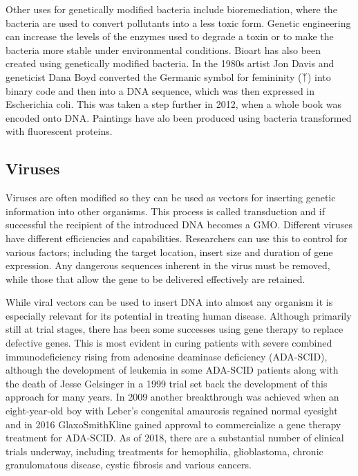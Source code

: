 Other uses for genetically modified bacteria include bioremediation, where the bacteria are used to convert pollutants into a less toxic form. Genetic engineering can increase the levels of the enzymes used to degrade a toxin or to make the bacteria more stable under environmental conditions. Bioart has also been created using genetically modified bacteria. In the 1980s artist Jon Davis and geneticist Dana Boyd converted the Germanic symbol for femininity (ᛉ) into binary code and then into a DNA sequence, which was then expressed in Escherichia coli. This was taken a step further in 2012, when a whole book was encoded onto DNA. Paintings have alo been produced using bacteria transformed with fluorescent proteins.

\hypertarget{viruses}{%
\subsection{Viruses}\label{viruses}}

Viruses are often modified so they can be used as vectors for inserting genetic information into other organisms. This process is called transduction and if successful the recipient of the introduced DNA becomes a GMO. Different viruses have different efficiencies and capabilities. Researchers can use this to control for various factors; including the target location, insert size and duration of gene expression. Any dangerous sequences inherent in the virus must be removed, while those that allow the gene to be delivered effectively are retained.

While viral vectors can be used to insert DNA into almost any organism it is especially relevant for its potential in treating human disease. Although primarily still at trial stages, there has been some successes using gene therapy to replace defective genes. This is most evident in curing patients with severe combined immunodeficiency rising from adenosine deaminase deficiency (ADA-SCID), although the development of leukemia in some ADA-SCID patients along with the death of Jesse Gelsinger in a 1999 trial set back the development of this approach for many years. In 2009 another breakthrough was achieved when an eight-year-old boy with Leber's congenital amaurosis regained normal eyesight and in 2016 GlaxoSmithKline gained approval to commercialize a gene therapy treatment for ADA-SCID. As of 2018, there are a substantial number of clinical trials underway, including treatments for hemophilia, glioblastoma, chronic granulomatous disease, cystic fibrosis and various cancers.

